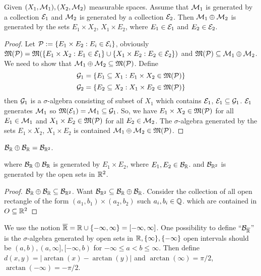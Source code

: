\begin{theorem}
  Given $(X_1, \mathcal M_1), (X_2, \mathcal M_2)$ measurable spaces. Assume that  
  $\mathcal M_1$ is generated by a collection $\mathcal E_1$ and $\mathcal M_2$ is generated by a collection $\mathcal E_2$.
  Then $\mathcal M_1 \oplus \mathcal M_2$ is generated by the sets $E_1 \times X_2$, $X_1 \times E_2$, where $E_1 \in \mathcal E_1$ and $E_2 \in \mathcal E_2$.
\end{theorem}
\begin{proof}
  Let $\mathcal P := \{E_1 \times E_2 : E_i \in \mathcal E_i\}$, obviously $\mathfrak M(\mathcal P) = \mathfrak M(\{E_1\times X_2 : E_1 \in \mathcal E_1\}\cup\{X_1 \times E_2 : E_2 \in \mathcal E_2\})$ and $\mathfrak M(\mathcal P) \subseteq \mathcal M_1 \oplus \mathcal M_2$.
  We need to show that $\mathcal M_1 \oplus \mathcal M_2 \subseteq \mathfrak M(\mathcal P)$. Define 
  $$\mathcal G_1 = \{E_1 \subseteq X_1 : E_1 \times X_2 \in \mathfrak M(\mathcal P)\}$$
  $$\mathcal G_2 = \{E_2 \subseteq X_2 : X_1 \times E_2 \in \mathfrak M(\mathcal P)\}$$
  then $\mathcal G_1$ is a $\sigma$-algebra consisting of subset of $X_1$ which contains $\mathcal E_1$, $\mathcal E_1\subseteq \mathcal G_1$.
  $\mathcal E_1$ generates $\mathcal M_1$ so $\mathfrak M(\mathcal E_1) = \mathcal M_1 \subseteq \mathcal G_1$.
  So, we have $E_1 \times X_2 \in \mathfrak M(\mathcal P)$ for all $E_1 \in \mathcal M_1$ and $X_1 \times E_2 \in \mathfrak M(\mathcal P)$ for all $E_2 \in \mathcal M_2$.
  The $\sigma$-algebra generated by the sets $E_1 \times X_2$, $X_1 \times E_2$ is contained $\mathcal M_1 \oplus \mathcal M_2 \in \mathfrak M(\mathcal P)$.
\end{proof}

\begin{claim}
  $\mathcal B_\mathbb R \oplus \mathcal B_\mathbb R = \mathcal B_{\mathbb R^2}$.

  where $\mathcal B_\mathbb R \oplus \mathcal B_\mathbb R$ is generated by $E_1 \times E_2$, where $E_1, E_2 \in \mathcal B_\mathbb R$.
  and $\mathcal B_{\mathbb R^2}$ is generated by the open sets in $\mathbb R^2$. 
\end{claim}

\begin{proof}
  $\mathcal B_\mathbb R \oplus \mathcal B_\mathbb R \subseteq \mathcal B_{\mathbb R^2}$. Want $\mathcal B_{\mathbb R^2} \subseteq \mathcal B_\mathbb R \oplus \mathcal B_\mathbb R$.
  Consider the collection of all open rectangle of the form $(a_1, b_1) \times (a_2, b_2)$ such $a_i, b_i \in \mathbb Q$.
  which are contained in $O \subseteq \mathbb R^2$
\end{proof}

\begin{definition}
We use the notion $\overline{\mathbb R} = \mathbb R \cup \{-\infty, \infty\} = [-\infty, \infty]$.
One possibility to define ``$\mathcal B_{\overline{\mathbb R}}$'' is the $\sigma$-algebra generated by open sets in $\mathbb R, \{\infty\}, \{-\infty\}$
open intervals should be $(a, b), (a, \infty], [-\infty, b)$ for $-\infty \leq a < b \leq \infty$. Then define $d(x, y) = |\arctan(x) - \arctan(y)|$ and 
$\arctan(\infty) = \pi/2$, $\arctan(-\infty) = -\pi/2$.
\end{definition}

